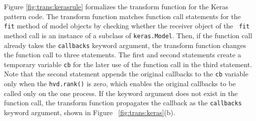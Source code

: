 Figure \ref{fig:trans:kerasrule} formalizes the transform function for the
Keras pattern code.
The transform function matches function call statements for the {\tt fit}
method of model objects by checking whether the receiver object of the {\tt
fit} method call is an instance of a subclass of {\tt keras.Model}.
Then, if the function call already takes the {\tt callbacks} keyword argument,
the transform function changes the function call to three statements. 
The first and second statements create a temporary variable {\tt cb} for the
later use of the function call in the third statement.
Note that the second statement appends the original callbacks to the {\tt cb}
variable only when the {\tt hvd.rank()} is zero, which enables the original
callbacks to be called only on the one process.
If the keyword argument does not exist in the function call, the transform
function propagates the callback as the {\tt callbacks} keyword argument, shown
in Figure~ \ref{fig:trans:keras}(b).

